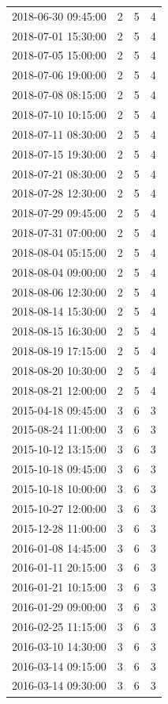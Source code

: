 \begin{tabular}{lrrr}
2018-06-30 09:45:00 & 2 & 5 & 4 \\
2018-07-01 15:30:00 & 2 & 5 & 4 \\
2018-07-05 15:00:00 & 2 & 5 & 4 \\
2018-07-06 19:00:00 & 2 & 5 & 4 \\
2018-07-08 08:15:00 & 2 & 5 & 4 \\
2018-07-10 10:15:00 & 2 & 5 & 4 \\
2018-07-11 08:30:00 & 2 & 5 & 4 \\
2018-07-15 19:30:00 & 2 & 5 & 4 \\
2018-07-21 08:30:00 & 2 & 5 & 4 \\
2018-07-28 12:30:00 & 2 & 5 & 4 \\
2018-07-29 09:45:00 & 2 & 5 & 4 \\
2018-07-31 07:00:00 & 2 & 5 & 4 \\
2018-08-04 05:15:00 & 2 & 5 & 4 \\
2018-08-04 09:00:00 & 2 & 5 & 4 \\
2018-08-06 12:30:00 & 2 & 5 & 4 \\
2018-08-14 15:30:00 & 2 & 5 & 4 \\
2018-08-15 16:30:00 & 2 & 5 & 4 \\
2018-08-19 17:15:00 & 2 & 5 & 4 \\
2018-08-20 10:30:00 & 2 & 5 & 4 \\
2018-08-21 12:00:00 & 2 & 5 & 4 \\
2015-04-18 09:45:00 & 3 & 6 & 3 \\
2015-08-24 11:00:00 & 3 & 6 & 3 \\
2015-10-12 13:15:00 & 3 & 6 & 3 \\
2015-10-18 09:45:00 & 3 & 6 & 3 \\
2015-10-18 10:00:00 & 3 & 6 & 3 \\
2015-10-27 12:00:00 & 3 & 6 & 3 \\
2015-12-28 11:00:00 & 3 & 6 & 3 \\
2016-01-08 14:45:00 & 3 & 6 & 3 \\
2016-01-11 20:15:00 & 3 & 6 & 3 \\
2016-01-21 10:15:00 & 3 & 6 & 3 \\
2016-01-29 09:00:00 & 3 & 6 & 3 \\
2016-02-25 11:15:00 & 3 & 6 & 3 \\
2016-03-10 14:30:00 & 3 & 6 & 3 \\
2016-03-14 09:15:00 & 3 & 6 & 3 \\
2016-03-14 09:30:00 & 3 & 6 & 3 \\

\end{tabular}
